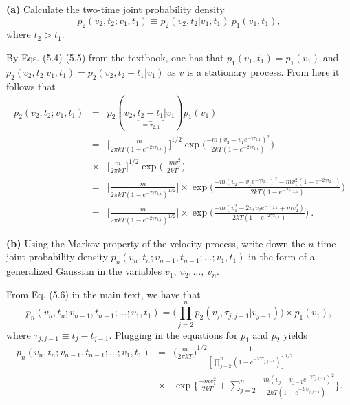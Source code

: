 \textbf{(a)} Calculate the two-time joint probability density
\begin{equation}
p_2(v_2,t_2;v_1,t_1) \equiv p_2(v_2, t_2 | v_1, t_1)~p_1(v_1, t_1),
\end{equation}
where $t_2>t_1$.

By Eqs. (5.4)-(5.5) from the textbook, one has that $p_1(v_1, t_1)=p_1(v_1)$ and $p_2(v_2, t_2 | v_1, t_1) = p_2(v_2, t_2-t_1 | v_1)$ as $v$ is a stationary process. From here it follows that
\begin{eqnarray}
p_2(v_2,t_2;v_1,t_1) &=& p_2(v_2, \underbrace{t_2-t_1}_{\equiv\tau_{2,1}} | v_1) p_1(v_1) \nonumber \\
&=& \bigg[\frac{m}{2\pi k T (1-e^{-2\gamma \tau_{2,1}})}\bigg]^{1/2} \exp\bigg(\frac{-m(v_2-v_1 e^{-\gamma \tau_{2,1}})^2}{2 k T (1-e^{-2\gamma \tau_{2,1}})}\bigg) \nonumber \\
&\times& \bigg[\frac{m}{2\pi k T}\bigg]^{1/2} \exp\bigg(\frac{-mv_1^2}{2 k T}\bigg) \nonumber \\
&=& \bigg[\frac{m}{2\pi k T (1-e^{-2\gamma \tau_{2,1}})^{1/2}}\bigg] \times \exp\bigg(\frac{-m(v_2-v_1 e^{-\gamma \tau_{2,1}})^2 -m v_1^2 (1-e^{-2\gamma \tau_{2,1}})}{2 k T (1-e^{-2\gamma \tau_{2,1}})} \bigg) \nonumber \\
&=& \boxed{\bigg[\frac{m}{2\pi k T (1-e^{-2\gamma \tau_{2,1}})^{1/2}}\bigg] \times \exp\bigg(\frac{-m(v_1^2-2 v_1 v_2 e^{-\gamma \tau_{2,1}} + m v_2^2)}{2 k T (1-e^{-2\gamma \tau_{2,1}})} \bigg)}~.  \label{eq:2_time_joint_probability}
\end{eqnarray}

\textbf{(b)} Using the Markov property of the velocity process, write down the $n$-time joint probability density $p_n(v_n,t_n;v_{n-1},t_{n-1};\ldots ; v_1, t_1)$ in the form of a generalized Gaussian in the variables $v_1,~v_2, \ldots,~ v_n$.

From Eq. (5.6) in the main text, we have that
\begin{equation}
p_n(v_n,t_n;v_{n-1},t_{n-1};\ldots ; v_1, t_1) = \bigg( \prod_{j=2}^{n} p_2(v_j, \tau_{j,j-1}|v_{j-1}) \bigg) \times p_1(v_1),
\end{equation}
where $\tau_{j,j-1} \equiv t_{j}-t_{j-1}$. Plugging in the equations for $p_1$ and $p_2$ yields
\begin{eqnarray}
p_n(v_n,t_n;v_{n-1},t_{n-1};\ldots ; v_1, t_1) &=& \bigg(\frac{m}{2 \pi k T}\bigg)^{1/2} \frac{1}{[\prod_{j=2}^{n} (1-e^{-2\gamma \tau_{j,j-1}})]^{1/2}} \nonumber \\
&\times& \exp\bigg\{ \frac{-m v_1^2}{2kT}+\sum_{j=2}^{n} \frac{-m(v_j-v_{j-1} e^{-\gamma \tau_{j,j-1}})^2}{2 k T (1-e^{-2 \gamma \tau_{j,j-1}})}\bigg\}. \label{eq:n_time_joint_probability}
\end{eqnarray}

